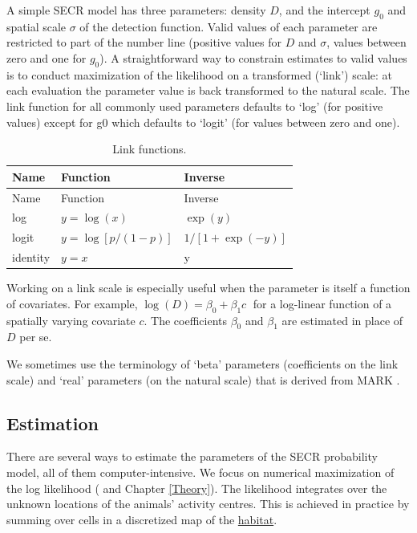 \documentclass[
]{book}
\begin{document}
A simple SECR model has three parameters: density \(D\), and the intercept \(g_0\) and spatial scale \(\sigma\) of the detection function. Valid values of each parameter are restricted to part of the number line (positive values for \(D\) and \(\sigma\), values between zero and one for \(g_0\)). A straightforward way to constrain estimates to valid values is to conduct maximization of the likelihood on a transformed (`link') scale: at each evaluation the parameter value is back transformed to the natural scale. The link function for all commonly used parameters defaults to `log' (for positive values) except for g0 which defaults to `logit' (for values between zero and one).

\begin{longtable}[]{@{}lll@{}}
\caption{\label{tab:links} Link functions.}\tabularnewline
\toprule\noalign{}
Name & Function & Inverse \\
\midrule\noalign{}
\endfirsthead
\toprule\noalign{}
Name & Function & Inverse \\
\midrule\noalign{}
\endhead
\bottomrule\noalign{}
\endlastfoot
log & \(y = \log(x)\) & \(\exp(y)\) \\
logit & \(y = \log[p/(1-p)]\) & \(1 / [1 + \exp(-y)]\) \\
identity & \(y=x\) & y \\
\end{longtable}

Working on a link scale is especially useful when the parameter is itself a function of covariates. For example, \(\log (D) = \beta_0 + \beta_1 c \;\) for a log-linear function of a spatially varying covariate \(c\). The coefficients \(\beta_0\) and \(\beta_1\) are estimated in place of \(D\) per se.

We sometimes use the terminology of `beta' parameters (coefficients on the link scale) and `real' parameters (on the natural scale) that is derived from MARK \citep{cw}.

\subsection{Estimation}\label{estimation}


There are several ways to estimate the parameters of the SECR probability model, all of them computer-intensive. We focus on numerical maximization of the log likelihood (\citet{be08} and Chapter \ref{Theory}). The likelihood integrates over the unknown locations of the animals' activity centres. This is achieved in practice by summing over cells in a discretized map of the \hyperref[Habitat]{habitat}.
\end{document}
